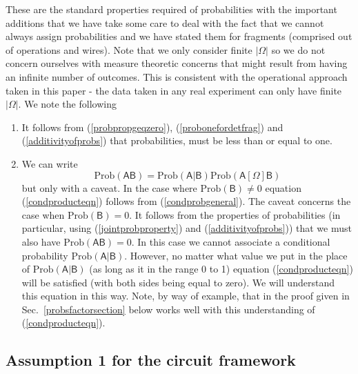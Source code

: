 \documentclass[10pt]{article}
\begin{document}
These are the standard properties required of probabilities with the important additions that we have take some care to deal with the fact that we cannot always assign probabilities and we have stated them for fragments (comprised out of operations and wires).  Note that we only consider finite $|\Omega|$ so we do not concern ourselves with measure theoretic concerns that might result from having an infinite number of outcomes.  This is consistent with the operational approach taken in this paper - the data taken in any real experiment can only have finite $|\Omega|$.  We note the following
\begin{enumerate}
\item It follows from (\ref{probpropgeqzero}), (\ref{probonefordetfrag}) and (\ref{additivityofprobs}) that probabilities, must be less than or equal to one.
\item We can write
\begin{equation}\label{condproducteqn}
\text{Prob}(\mathsf{AB})={\text{Prob}(\mathsf{A|B})}{\text{Prob}(\mathsf{A}[\Omega]\mathsf{B})}
\end{equation}
but only with a caveat.  In the case where $\text{Prob}(\mathsf{B})\not=0$ equation (\ref{condproducteqn}) follows from (\ref{condprobgeneral}).  The caveat concerns the case when $\text{Prob}(\mathsf{B})=0$.  It follows from the properties of probabilities (in particular, using (\ref{jointprobproperty}) and (\ref{additivityofprobs})) that we must also have $\text{Prob}(\mathsf{A}\mathsf{B})=0$.   In this case we cannot associate a conditional probability $\text{Prob}(\mathsf{A|B})$.  However, no matter what value we put in the place of $\text{Prob}(\mathsf{A|B})$ (as long as it in the range 0 to 1)  equation (\ref{condproducteqn}) will be satisfied (with both sides being equal to zero).  We will understand this equation in this way. Note, by way of example, that in the proof given in Sec.\ \ref{probsfactorsection} below works well with this understanding of (\ref{condproducteqn}).
\end{enumerate}


\subsection{Assumption 1 for the circuit framework}\label{Assumponesec}
\end{document}
